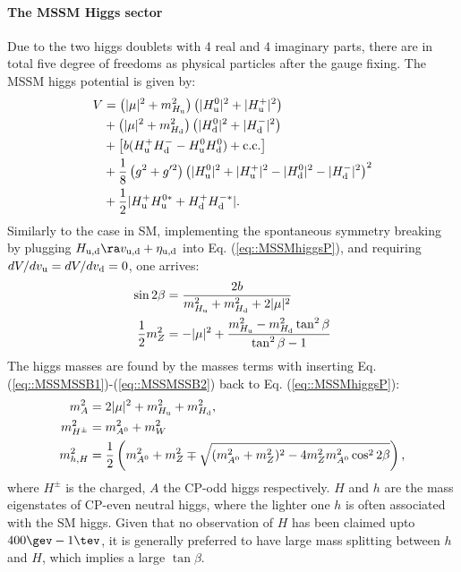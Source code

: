 \paragraph{The MSSM Higgs sector}
Due to the two higgs doublets with 4 real and 4 imaginary parts, 
there are in total five degree of freedoms as physical particles after the gauge fixing.
The MSSM higgs potential is given by:
\begin{align}
V 
& = \left( |\mu|^2 + m^2_{H_{\mathrm{u}}} \right)  \left( |H^0_{\mathrm{u}}|^2+|H^+_{\mathrm{u}}|^2 \right) \nonumber \\
& + \left( |\mu|^2 + m^2_{H_{\mathrm{d}}} \right)  \left( |H^0_{\mathrm{d}}|^2+|H^-_{\mathrm{d}}|^2 \right) \nonumber \\
& + \left[ b (H^+_{\mathrm{u}} H^-_{\mathrm{d}}-H^0_{\mathrm{u}} H^0_{\mathrm{d}}) + \mathrm{c.c.} \right] \nonumber \\
& + \frac{1}{8} \left(g^2+g'^2 \right) \left(   |H^0_{\mathrm{u}}|^2+|H^+_{\mathrm{u}}|^2-|H^0_{\mathrm{d}}|^2-|H^-_{\mathrm{d}}|^2   \right) ^2  \nonumber \\
& + \frac{1}{2} |H^+_{\mathrm{u}} H^{0*}_{\mathrm{u}} + H^+_{\mathrm{d}} H^{-*}_{\mathrm{d}}|. 
\label{eq::MSSMhiggsP}
\end{align}
Similarly to the case in SM, implementing the spontaneous symmetry breaking by
plugging $H_{\mup,\mdn} \ra v_{\mup,\mdn} + \eta_{\mup,\mdn}$ into Eq. (\ref{eq::MSSMhiggsP}),
and requiring $dV/dv_{\mathrm{u}} = dV/dv_{\mathrm{d}} = 0$, one arrives:
\begin{align}
\sin{2\beta} & = \dfrac{2b}{m^2_{H_{\mathrm{u}}} + m^2_{H_{\mathrm{d}}} + 2|\mu|^2 } \label{eq::MSSMSSB1} \\ 
\frac{1}{2} m_Z^2 & = -|\mu|^2 + \dfrac{m^2_{H_{\mathrm{u}}}-m^2_{H_{\mathrm{d}}}\tan^2{\beta}}{\tan^2{\beta}-1} \label{eq::MSSMSSB2}
\end{align}
The higgs masses are found by the masses terms with inserting Eq. (\ref{eq::MSSMSSB1})-(\ref{eq::MSSMSSB2}) back to Eq. (\ref{eq::MSSMhiggsP}):
\begin{align}
m^2_{A} & = 2 |\mu|^2 + m^2_{H_{\mathrm{u}}} + m^2_{H_{\mathrm{d}}}, \nonumber \\
m^2_{H^{\pm}} & = m^2_{A^0} + m^2_W \nonumber \\
m^2_{h,H} & = \dfrac{1}{2} \left( m^2_{A^0} + m_Z^2 \mp \sqrt{(m^2_{A^0} + m^2_Z)^2-4m_Z^2 m^2_{A^0}\cos^2{2\beta}}   \right),
\label{eq::MSSMhiggsMass}
\end{align}
where $H^{\pm}$ is the charged, $A$ the CP-odd higgs respectively. 
$H$ and $h$ are the mass eigenstates of CP-even neutral higgs, where the lighter one $h$ is often associated with the SM higgs. Given that no observation of $H$ has been claimed upto $400\gev-1\tev$, it is generally preferred to have large mass splitting between $h$ and $H$, which implies a large $\tan{\beta}$. \\





